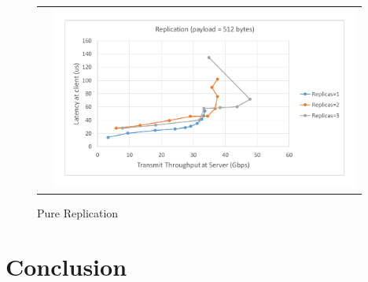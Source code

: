 \documentclass[letterpaper,twocolumn,10pt]{article}
\begin{document}
\begin{figure}
\begin{tabular}{cc}
\begin{minipage}{0.5\textwidth}
\end{minipage}&
\begin{minipage}{0.5\textwidth}
  \includegraphics[width=\textwidth,height=6cm]{results/replication_gbps_512.pdf}
\end{minipage}
\end{tabular}
\caption{Pure Replication}
\label{fig:pure_rep}
\end{figure}

\section{Conclusion}
\end{document}
